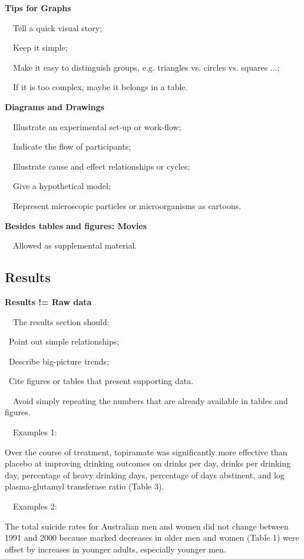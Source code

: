 \documentclass[a4paper, 12pt]{article}
\begin{document}
\textbf{Tips for Graphs}
\par\ \textbullet\ Tell a quick visual story;
\par\ \textbullet\ Keep it simple;
\par\ \textbullet\ Make it easy to distinguish groups, e.g. triangles vs. circles vs. squares ...;
\par\ \textbullet\ If it is too complex, maybe it belongs in a table.

\newpage\textbf{Diagrams and Drawings}
\par\ \textbullet\ Illustrate an experimental set-up or work-flow;
\par\ \textbullet\ Indicate the flow of participants;
\par\ \textbullet\ Illustrate cause and effect relationships or cycles;
\par\ \textbullet\ Give a hypothetical model;
\par\ \textbullet\ Represent microscopic particles or microorganisms as cartoons.

\textbf{Besides tables and figures: Movies}
\par\ \textbullet\ Allowed as supplemental material.

\newpage\subsection{Results}

\textbf{Results != Raw data}
\par\ \textbullet\ The results section should:
\par\quad\textopenbullet\ Point out simple relationships;
\par\quad\textopenbullet\ Describe big-picture trends;
\par\quad\textopenbullet\ Cite figures or tables that present supporting data.
\par\ \textbullet\ Avoid simply repeating the numbers that are already available in tables and figures.

\par\ \textbullet\ Examples 1:
\par Over the course of treatment, topiramate was significantly more effective than placebo at improving drinking outcomes on drinks per day,
drinks per drinking day, percentage of heavy drinking days, percentage of days abstinent, and log plasma-glutamyl transferase ratio (Table 3).

\par\ \textbullet\ Examples 2:
\par The total suicide rates for Australian men and women did not change between 1991 and 2000 because marked decreases in older men and women (Table 1) were offset by increases in younger adults,
especially younger men.
\end{document}
